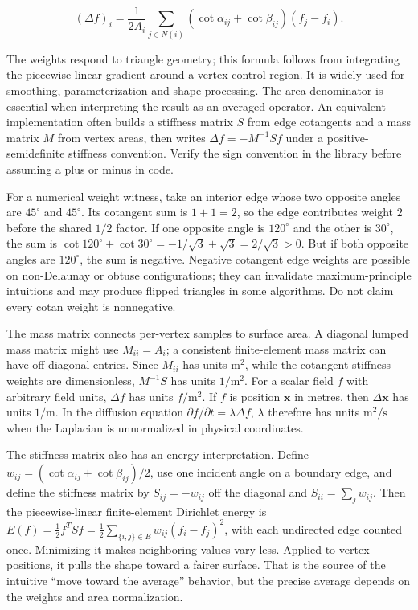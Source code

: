 \[
(\Delta f)_i=\frac{1}{2A_i}\sum_{j\in N(i)}(\cot\alpha_{ij}+\cot\beta_{ij})(f_j-f_i).
\]

The weights respond to triangle geometry; this formula follows from integrating the piecewise-linear gradient around a vertex control region. It is widely used for smoothing, parameterization and shape processing. The area denominator is essential when interpreting the result as an averaged operator. An equivalent implementation often builds a stiffness matrix \(S\) from edge cotangents and a mass matrix \(M\) from vertex areas, then writes \(\Delta f=-M^{-1}Sf\) under a positive-semidefinite stiffness convention. Verify the sign convention in the library before assuming a plus or minus in code.

For a numerical weight witness, take an interior edge whose two opposite angles are \(45^\circ\) and \(45^\circ\). Its cotangent sum is \(1+1=2\), so the edge contributes weight \(2\) before the shared \(1/2\) factor. If one opposite angle is \(120^\circ\) and the other is \(30^\circ\), the sum is \(\cot120^\circ+\cot30^\circ=-1/\sqrt3+\sqrt3=2/\sqrt3>0\). But if both opposite angles are \(120^\circ\), the sum is negative. Negative cotangent edge weights are possible on non-Delaunay or obtuse configurations; they can invalidate maximum-principle intuitions and may produce flipped triangles in some algorithms. Do not claim every cotan weight is nonnegative.

The mass matrix connects per-vertex samples to surface area. A diagonal lumped mass matrix might use \(M_{ii}=A_i\); a consistent finite-element mass matrix can have off-diagonal entries. Since \(M_{ii}\) has units \(\mathrm m^2\), while the cotangent stiffness weights are dimensionless, \(M^{-1}S\) has units \(1/\mathrm m^2\). For a scalar field \(f\) with arbitrary field units, \(\Delta f\) has units \(f/\mathrm m^2\). If \(f\) is position \(\mathbf x\) in metres, then \(\Delta\mathbf x\) has units \(1/\mathrm m\). In the diffusion equation \(\partial f/\partial t=\lambda\Delta f\), \(\lambda\) therefore has units \(\mathrm m^2/\mathrm s\) when the Laplacian is unnormalized in physical coordinates.

The stiffness matrix also has an energy interpretation. Define \(w_{ij}=(\cot\alpha_{ij}+\cot\beta_{ij})/2\), use one incident angle on a boundary edge, and define the stiffness matrix by \(S_{ij}=-w_{ij}\) off the diagonal and \(S_{ii}=\sum_j w_{ij}\). Then the piecewise-linear finite-element Dirichlet energy is \(E(f)=\frac12 f^T S f=\frac12\sum_{\{i,j\}\in E}w_{ij}(f_i-f_j)^2\), with each undirected edge counted once. Minimizing it makes neighboring values vary less. Applied to vertex positions, it pulls the shape toward a fairer surface. That is the source of the intuitive ``move toward the average'' behavior, but the precise average depends on the weights and area normalization.


